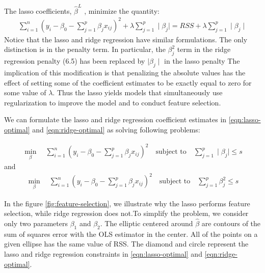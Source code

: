The lasso  coefficients, $\hat{\beta}^L$ , minimize the quantity:
\begin{eqnarray}
    \label{eqn:lasso-optimal}
    \sum_{i=1}^{n}(y_i -\beta_0 - \sum_{j=1}^{p}\beta_j x_{ij}) ^ 2 + \lambda
    \sum_{j=1}^{p} \mid \beta_{j} \mid= RSS + \lambda \sum_{j=1}^{p} \mid \beta_{j} \mid
\end{eqnarray}
Notice that the lasso and ridge regression have similar formulations. The only distinction is in the penalty term. In particular, the $\beta_j^2$ term in the ridge regression penalty (6.5) has been replaced by $\mid \beta_{j} \mid$ in the lasso penalty
The implication of this modification is that penalizing the absolute values has the effect of setting some of the coefficient estimates to be exactly equal to zero for some value of $\lambda$. Thus the lasso yields models that simultaneously use regularization to improve the model and to conduct feature selection.

We can formulate the lasso and ridge regression coefficient estimates in
\ref{eqn:lasso-optimal} and \ref{eqn:ridge-optimal} as solving following
problems:

\begin{equation}
    \label{eqn:ridge-optimal}
    \begin{aligned}
    \min_{\beta} \quad \sum_{i=1}^{n}(y_i -\beta_0 - \sum_{j=1}^{p}\beta_j
    x_{ij}) ^ 2  \quad \textrm{subject to} \quad \sum_{j=1}^{p}\mid\beta_j\mid
    \leq s
    \end{aligned}
\end{equation}
and
\begin{equation}
    \label{eqn:lass-optimal}
    \begin{aligned}
    \min_{\beta} \quad \sum_{i=1}^{n}(y_i -\beta_0 - \sum_{j=1}^{p}\beta_j
    x_{ij}) ^ 2  \quad \textrm{subject to} \quad \sum_{j=1}^{p}\beta_j^2\leq s
    \end{aligned}
\end{equation}

In the figure \ref{fig:feature-selection}, we illustrate why the lasso performs
feature selection, while ridge regression does not.To simplify the problem, we
consider only two parameters $\beta_1$ and $\beta_2$.
The elliptic centered around $\hat{\beta}$ are contours of the sum of squares
error with the OLS estimator in the center. All of the points on a given ellipse
has the same value of RSS. The diamond and circle represent the lasso and ridge
regression constraints in \ref{eqn:lasso-optimal} and \ref{eqn:ridge-optimal}.

